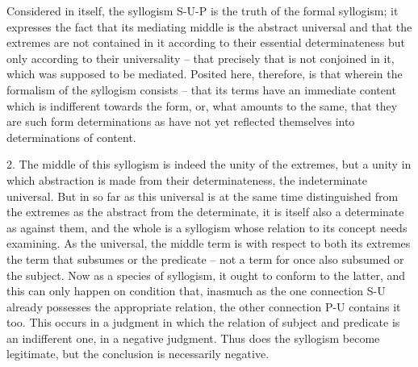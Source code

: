 Considered in itself, the syllogism S-U-P is the truth of the formal
syllogism; it expresses the fact that its mediating middle is the abstract
universal and that the extremes are not contained in it according to their
essential determinateness but only according to their universality – that
precisely that is not conjoined in it, which was supposed to be mediated.
Posited here, therefore, is that wherein the formalism of the syllogism
consists – that its terms have an immediate content which is indifferent
towards the form, or, what amounts to the same, that they are such form
determinations as have not yet reflected themselves into determinations of
content.

2. The middle of this syllogism is indeed the unity of the extremes,
but a unity in which abstraction is made from their determinateness, the
indeterminate universal. But in so far as this universal is at the same time
distinguished from the extremes as the abstract from the determinate, it is
itself also a determinate as against them, and the whole is a syllogism whose
relation to its concept needs examining. As the universal, the middle term is
with respect to both its extremes the term that subsumes or the predicate –
not a term for once also subsumed or the subject. Now as a species of
syllogism, it ought to conform to the latter, and this can only happen
on condition that, inasmuch as the one connection S-U already possesses
the appropriate relation, the other connection P-U contains it too. This
occurs in a judgment in which the relation of subject and predicate is an
indifferent one, in a negative judgment. Thus does the syllogism become
legitimate, but the conclusion is necessarily negative.

